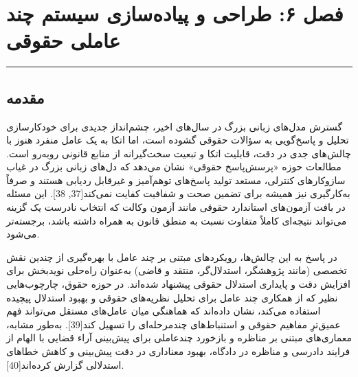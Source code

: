 \documentclass[12pt,a4paper]{report}
\begin{document}
	\sloppy
	
	
	\chapter*{\bfseries فصل ۶: طراحی و پیاده‌سازی سیستم چند عاملی حقوقی}
	
	\vspace{-2em}
	\noindent\rule{\textwidth}{0.5pt}
	\vspace{0.5em}
	
	\section{مقدمه}
	
	گسترش مدل‌های زبانی بزرگ در سال‌های اخیر، چشم‌انداز جدیدی برای خودکارسازی تحلیل و پاسخ‌گویی به سؤالات حقوقی گشوده است، اما اتکا به یک عامل منفرد هنوز با چالش‌های جدی در دقت، قابلیت اتکا و تبعیت سخت‌گیرانه از منابع قانونی روبه‌رو است. مطالعات حوزه «پرسش‌پاسخ حقوقی» نشان می‌دهد که دل‌های زبانی بزرگ در غیاب سازوکارهای کنترلی، مستعد تولید پاسخ‌های توهم‌آمیز و غیرقابل ردیابی هستند و صرفاً به‌کارگیری  نیز همیشه برای تضمین صحت و شفافیت کفایت نمی‌کند[37, 38]. این مسئله در بافت آزمون‌های استاندارد حقوقی مانند آزمون وکالت که انتخاب نادرست یک گزینه می‌تواند نتیجه‌ای کاملاً متفاوت نسبت به منطق قانون به همراه داشته باشد، برجسته‌تر می‌شود.
	
	در پاسخ به این چالش‌ها، رویکردهای مبتنی بر چند عامل  با بهره‌گیری از چندین نقش تخصصی (مانند پژوهشگر، استدلال‌گر، منتقد و قاضی) به‌عنوان راه‌حلی نویدبخش برای افزایش دقت و پایداری استدلال حقوقی پیشنهاد شده‌اند. در حوزه حقوق، چارچوب‌هایی نظیر  که از همکاری چند عامل برای تحلیل نظریه‌های حقوقی و بهبود استدلال پیچیده استفاده می‌کند، نشان داده‌اند که هماهنگی میان عامل‌های مستقل می‌تواند فهم عمیق‌ترِ مفاهیم حقوقی و استنباط‌های چندمرحله‌ای را تسهیل کند[39]. به‌طور مشابه، معماری‌های مبتنی بر مناظره و بازخورد چندعاملی برای پیش‌بینی آراء قضایی با الهام از فرایند دادرسی و مناظره در دادگاه، بهبود معناداری در دقت پیش‌بینی و کاهش خطاهای استدلالی گزارش کرده‌اند[40].
	
\end{document}

